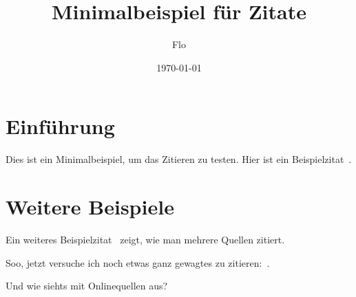 \documentclass{article}
\title{Minimalbeispiel für Zitate}
\author{Flo}
\date{\today}
\begin{document}
\maketitle

\section{Einführung}
Dies ist ein Minimalbeispiel, um das Zitieren zu testen. Hier ist ein Beispielzitat~\cite{Zweig.1964b}.

\section{Weitere Beispiele}
Ein weiteres Beispielzitat~\cite{GellMann.1964, Zweig.1964} zeigt, wie man mehrere Quellen zitiert.

Soo, jetzt versuche ich noch etwas ganz gewagtes zu zitieren:~\cite{C.Amsler.2017}.

Und wie siehts mit Onlinequellen aus?~\cite{Wikipedia.Standardmodell}

\printbibliography
\end{document}
